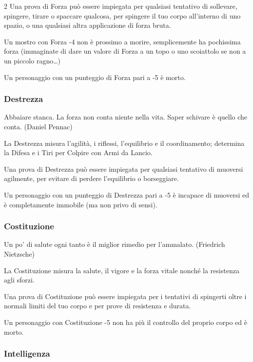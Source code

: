\begin{multicols}{2}
Una prova di Forza può essere impiegata per qualsiasi tentativo di sollevare, spingere, tirare o spaccare qualcosa, per spingere il tuo corpo all'interno di uno spazio, o una qualsiasi altra applicazione di forza bruta.

Un mostro con Forza -4 non è prossimo a morire, semplicemente ha pochissima forza (immaginate di dare un valore di Forza a un topo o uno scoiattolo se non a un piccolo ragno…)

Un personaggio con un punteggio di Forza pari a -5 è morto.

\subsubsection{Destrezza}\label{destrezza}

\begin{enfasi}{
Abbaiare stanca. La forza non conta niente nella vita. Saper schivare è quello che conta. (Daniel Pennac)
}\end{enfasi}

La Destrezza misura l'agilità, i riflessi, l'equilibrio e il coordinamento; determina la Difesa e i Tiri per Colpire con Armi da Lancio.

Una prova di Destrezza può essere impiegata per qualsiasi tentativo di muoversi agilmente, per evitare di perdere l'equilibrio o borseggiare.

Un personaggio con un punteggio di Destrezza pari a -5 è incapace di muoversi ed è completamente immobile (ma non privo di sensi).

\subsubsection{Costituzione}\label{costituzione}

\begin{enfasi}{
Un po' di salute ogni tanto è il miglior rimedio per l'ammalato. (Friedrich Nietzsche)
}\end{enfasi}

La Costituzione misura la salute, il vigore e la forza vitale nonché la resistenza agli sforzi.

Una prova di Costituzione può essere impiegata per i tentativi di spingerti oltre i normali limiti del tuo corpo e per prove di resistenza e durata.

Un personaggio con Costituzione -5 non ha più il controllo del proprio corpo ed è morto.

\subsubsection{Intelligenza}\label{intelligenza}


\end{multicols}
